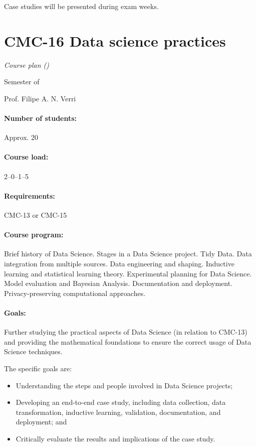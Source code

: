 Case studies will be presented during exam weeks.
\thispagestyle{empty}

\newpage
{}
\thispagestyle{empty}
\section*{CMC-16 Data science practices}

\emph{Course plan (\the\year{})}

 Semester of \the\year{}

Prof. Filipe A. N. Verri

\paragraph{Number of students:} Approx. 20

\paragraph{Course load:} 2--0--1--5

\paragraph{Requirements:} CMC-13 or CMC-15

\paragraph{Course program:}
Brief history of Data Science. Stages in a Data Science project. Tidy Data. Data
integration from multiple sources. Data engineering and shaping. Inductive learning and
statistical learning theory. Experimental planning for Data Science. Model evaluation and
Bayesian Analysis. Documentation and deployment. Privacy-preserving computational
approaches.

\paragraph{Goals:}
Further studying the practical aspects of Data Science (in relation to CMC-13) and providing
the mathematical foundations to ensure the correct usage of Data Science techniques.

The specific goals are:
\begin{itemize}
  \item Understanding the steps and people involved in Data Science projects;
  \item Developing an end-to-end case study, including data collection, data transformation,
    inductive learning, validation, documentation, and deployment; and
  \item Critically evaluate the results and implications of the case study.
\end{itemize}

